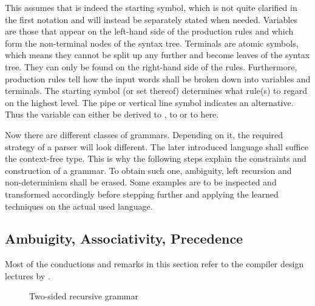 This assumes that  is indeed the starting symbol, which is not quite clarified in the first notation and will instead be separately stated when needed. Variables are those that appear on the left-hand side of the production rules and which form the non-terminal nodes of the syntax tree. Terminals are atomic symbols, which means they cannot be split up any further and become leaves of the syntax tree. They can only be found on the right-hand side of the rules. Furthermore, production rules tell how the input words shall be broken down into variables and terminals. The starting symbol (or set thereof) determines what rule(s) to regard on the highest level. The pipe or vertical line symbol \textbar{} indicates an alternative. Thus the variable  can either be derived to , to  or to  here.

Now there are different classes of grammars. Depending on it, the required strategy of a parser will look different. The later introduced language shall suffice the context-free \textlang{} type. This is why the following steps explain the constraints and construction of a \textlang{} grammar. To obtain such one, ambiguity, left recursion and non-determinism shall be erased. Some examples are to be inspected and transformed accordingly before stepping further and applying the learned techniques on the actual used language.

\subsection{Ambuigity, Associativity, Precedence}\FloatBarrier

Most of the conductions and remarks in this section refer to the compiler design lectures by \cite{gate_compiler_design}.

\begin{figure}
	\centering
	
	
	
	\caption{Two-sided recursive grammar}
	\label{fig:grammar_example_amb}
\end{figure}


